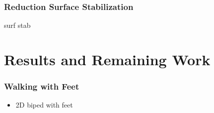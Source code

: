 \documentclass{beamer}
\begin{document}
\begin{frame}
  \frametitle{Reduction Surface Stabilization}
  surf stab
\end{frame}

\section{Results and Remaining Work}
\begin{frame}
  \frametitle{Walking with Feet}
  \begin{itemize}
  \item 2D biped with feet
  \end{itemize}
\end{frame}


%
%
%



\end{document}
